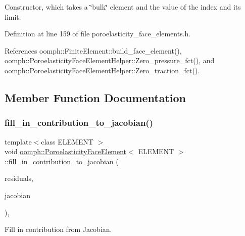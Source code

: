 Constructor, which takes a \char`\"{}bulk\char`\"{} element and the value of the index and its limit. 



Definition at line 159 of file poroelasticity\+\_\+face\+\_\+elements.\+h.



References oomph\+::\+Finite\+Element\+::build\+\_\+face\+\_\+element(), oomph\+::\+Poroelasticity\+Face\+Element\+Helper\+::\+Zero\+\_\+pressure\+\_\+fct(), and oomph\+::\+Poroelasticity\+Face\+Element\+Helper\+::\+Zero\+\_\+traction\+\_\+fct().



\subsection{Member Function Documentation}
\mbox{\label{classoomph_1_1PoroelasticityFaceElement_a14cbf11e9cf001563087f15f8f9806b7}} 
\subsubsection{\texorpdfstring{fill\+\_\+in\+\_\+contribution\+\_\+to\+\_\+jacobian()}{fill\_in\_contribution\_to\_jacobian()}}
{\footnotesize\ttfamily template$<$class E\+L\+E\+M\+E\+NT $>$ \\
void \hyperlink{classoomph_1_1PoroelasticityFaceElement}{oomph\+::\+Poroelasticity\+Face\+Element}$<$ E\+L\+E\+M\+E\+NT $>$\+::fill\+\_\+in\+\_\+contribution\+\_\+to\+\_\+jacobian (\begin{DoxyParamCaption}\item[{\hyperlink{classoomph_1_1Vector}{Vector}$<$ double $>$ \&}]{residuals,  }\item[{\hyperlink{classoomph_1_1DenseMatrix}{Dense\+Matrix}$<$ double $>$ \&}]{jacobian }\end{DoxyParamCaption})\hspace{0.3cm}{\ttfamily [inline]}, {\ttfamily [virtual]}}



Fill in contribution from Jacobian. 



